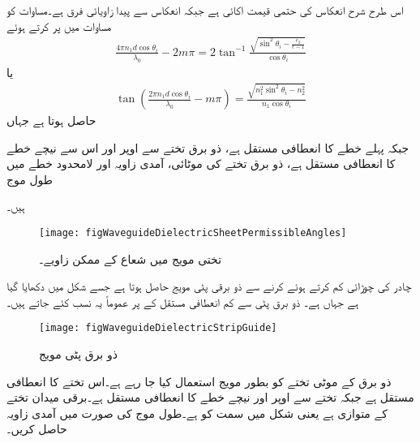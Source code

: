اس طرح شرح انعکاس  کی حتمی قیمت اکائی ہے جبکہ انعکاس سے پیدا زاویائی فرق  ہے۔مساوات  کو مساوات  میں پر کرتے ہوئے
\begin{align}
\frac{4 \pi n_1 d \cos \theta_i}{\lambda_0}-2 m\pi=2\tan^{-1}\frac{\sqrt{\sin^2 \theta_i -\frac{\epsilon_2}{\epsilon-1}} }{\cos \theta_i}
\end{align}
یا
\begin{align}\label{مساوات_مویج_تختی_مویج_زاویہ}
\tan \left( \frac{2 \pi n_1 d \cos \theta_i}{\lambda_0}-m \pi\right)=\frac{\sqrt{n_1^2 \sin^2 \theta_i -n_2^2}}{n_1 \cos \theta_i}
\end{align}
حاصل ہوتا ہے جہاں
\begin{description}
 جبکہ
 پہلے خطے کا  انعطافی مستقل  ہے،
 ذو برق تختے سے اوپر اور اس سے نیچے خطے کا  انعطافی مستقل  ہے،
 ذو برق تختے کی موٹائی،
 آمدی زاویہ اور
 لامحدود خطے میں طول موج
\end{description}
ہیں۔
\begin{figure}
\centering
\texttt{[image: figWaveguideDielectricSheetPermissibleAngles]}
\caption{تختی مویج میں شعاع کے ممکن زاویے۔}
\label{شکل_تختی_مویج_شعاع_ممکن_زاویے}
\end{figure}

چادر کی چوڑائی کم کرتے ہوئے  کرنے سے  ذو برقی پٹی مویج حاصل ہوتا ہے جسے شکل  میں دکھایا گیا ہے جہاں  ہے۔ ذو برق پٹی سے کم  انعطافی مستقل کے  پر عموماً یہ نسب کئے جاتے ہیں۔ 


\begin{figure}
\centering
\texttt{[image: figWaveguideDielectricStripGuide]}
\caption{ذو برق پٹی مویج}
\label{شکل_مویج_ذو_برق_پٹی}
\end{figure}
ذو برق کے  موٹی تختے کو بطور مویج استعمال کیا جا رہے ہے۔اس تختے کا  انعطافی مستقل  ہے جبکہ تختے سے اوپر اور نیچے خطے کا  انعطافی مستقل  ہے۔برقی میدان تختے کے متوازی ہے یعنی شکل  میں  سمت کو ہے۔طول موج  کی صورت میں آمدی زاویہ  حاصل کریں۔

